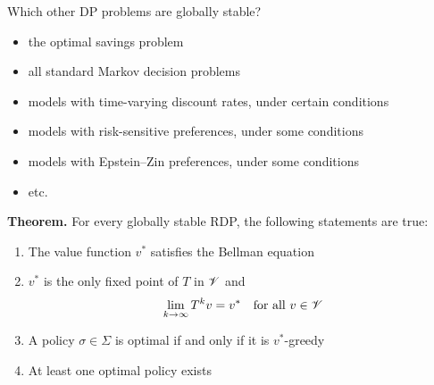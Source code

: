 \begin{frame}

    Which other DP problems are globally stable?

        \vspace{0.5em}
    \begin{itemize}
        \item the optimal savings problem
            \vspace{0.5em}
        \item all standard Markov decision problems
            \vspace{0.5em}
        \item models with time-varying discount rates, under certain
            conditions
            \vspace{0.5em}
        \item models with risk-sensitive preferences, under some conditions
            \vspace{0.5em}
        \item models with Epstein--Zin preferences, under some conditions
            \vspace{0.5em}
        \item etc.
    \end{itemize}
    

\end{frame}



\begin{frame}
    

    {\bf Theorem.} For every globally stable RDP, the following statements are true:
    \begin{enumerate}
        \item The value function $v^*$ satisfies the Bellman equation
            \vspace{1em}
        \item $v^*$ is the only fixed point of $T$ in
            $\mathscr V$ and 
            \begin{equation*}
                \lim_{k \to \infty} T^k v = v^*
                \quad \text{for all } v \in \mathscr V
            \end{equation*}
        \item A policy $\sigma \in \Sigma$ is optimal if and only if it is
            $v^*$-greedy
            \vspace{1em}
        \item At least one optimal policy exists
    \end{enumerate}

\end{frame}



